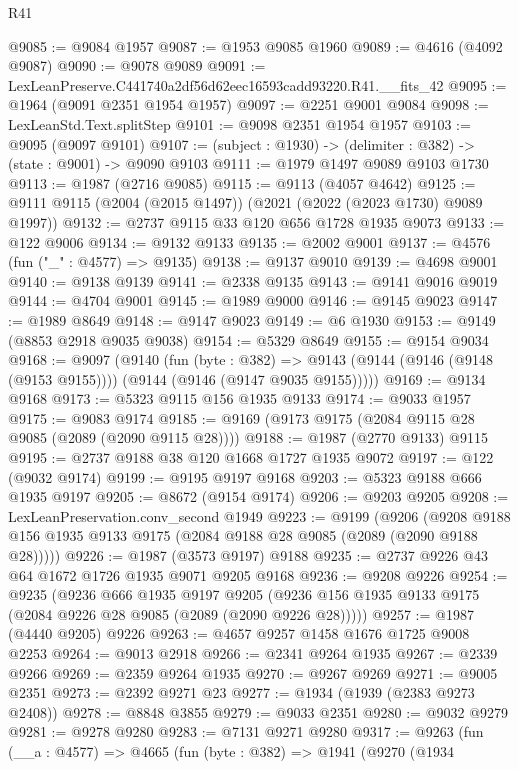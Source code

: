 \begin{lexlean}{R41}
\begin{coremodule}
@9085 := @9084 @1957
@9087 := @1953 @9085 @1960
@9089 := @4616 (@4092 @9087)
@9090 := @9078 @9089
@9091 := LexLeanPreserve.C441740a2df56d62eec16593cadd93220.R41.__fits_42
@9095 := @1964 (@9091 @2351 @1954 @1957)
@9097 := @2251 @9001 @9084
@9098 := LexLeanStd.Text.splitStep
@9101 := @9098 @2351 @1954 @1957
@9103 := @9095 (@9097 @9101)
@9107 := (subject : @1930) -> (delimiter : @382) -> (state : @9001) -> @9090 @9103
@9111 := @1979 @1497 @9089 @9103 @1730
@9113 := @1987 (@2716 @9085)
@9115 := @9113 (@4057 @4642)
@9125 := @9111 @9115 (@2004 (@2015 @1497)) (@2021 (@2022 (@2023 @1730) @9089 @1997))
@9132 := @2737 @9115 @33 @120 @656 @1728 @1935 @9073
@9133 := @122 @9006
@9134 := @9132 @9133
@9135 := @2002 @9001
@9137 := @4576 (fun ("_" : @4577) => @9135)
@9138 := @9137 @9010
@9139 := @4698 @9001
@9140 := @9138 @9139
@9141 := @2338 @9135
@9143 := @9141 @9016 @9019
@9144 := @4704 @9001
@9145 := @1989 @9000
@9146 := @9145 @9023
@9147 := @1989 @8649
@9148 := @9147 @9023
@9149 := @6 @1930
@9153 := @9149 (@8853 @2918 @9035 @9038)
@9154 := @5329 @8649
@9155 := @9154 @9034
@9168 := @9097
    (@9140
      (fun (byte : @382) =>
      @9143 (@9144 (@9146 (@9148 (@9153 @9155)))) (@9144 (@9146 (@9147 @9035 @9155)))))
@9169 := @9134 @9168
@9173 := @5323 @9115 @156 @1935 @9133
@9174 := @9033 @1957
@9175 := @9083 @9174
@9185 := @9169 (@9173 @9175 (@2084 @9115 @28 @9085 (@2089 (@2090 @9115 @28))))
@9188 := @1987 (@2770 @9133) @9115
@9195 := @2737 @9188 @38 @120 @1668 @1727 @1935 @9072
@9197 := @122 (@9032 @9174)
@9199 := @9195 @9197 @9168
@9203 := @5323 @9188 @666 @1935 @9197
@9205 := @8672 (@9154 @9174)
@9206 := @9203 @9205
@9208 := LexLeanPreservation.conv_second @1949
@9223 := @9199
    (@9206 (@9208 @9188 @156 @1935 @9133 @9175 (@2084 @9188 @28 @9085 (@2089 (@2090 @9188 @28)))))
@9226 := @1987 (@3573 @9197) @9188
@9235 := @2737 @9226 @43 @64 @1672 @1726 @1935 @9071 @9205 @9168
@9236 := @9208 @9226
@9254 := @9235
    (@9236
      @666
      @1935
      @9197
      @9205
      (@9236 @156 @1935 @9133 @9175 (@2084 @9226 @28 @9085 (@2089 (@2090 @9226 @28)))))
@9257 := @1987 (@4440 @9205) @9226
@9263 := @4657 @9257 @1458 @1676 @1725 @9008 @2253
@9264 := @9013 @2918
@9266 := @2341 @9264 @1935
@9267 := @2339 @9266
@9269 := @2359 @9264 @1935
@9270 := @9267 @9269
@9271 := @9005 @2351
@9273 := @2392 @9271 @23
@9277 := @1934 (@1939 (@2383 @9273 @2408))
@9278 := @8848 @3855
@9279 := @9033 @2351
@9280 := @9032 @9279
@9281 := @9278 @9280
@9283 := @7131 @9271 @9280
@9317 := @9263
    (fun (__a : @4577) =>
    @4665
      (fun (byte : @382) =>
      @1941
        (@9270
          (@1934

\end{coremodule}
\end{lexlean}
